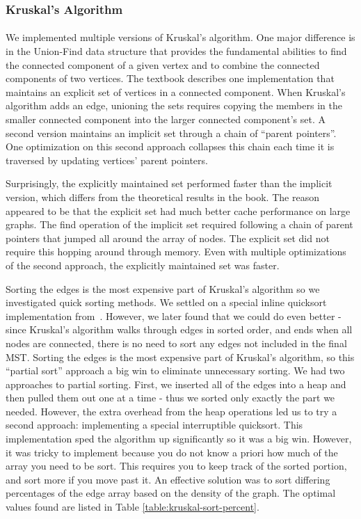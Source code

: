 \subsubsection{Kruskal's Algorithm}
\paragraph{}
We implemented multiple versions of Kruskal's algorithm. One major difference is
in the Union-Find data structure that provides the fundamental abilities to find
the connected component of a given vertex and to combine the connected
components of two vertices. The textbook describes one implementation that
maintains an explicit set of vertices in a connected component. When Kruskal's
algorithm adds an edge, unioning the sets requires copying the members in the
smaller connected component into the larger connected component's set. A second
version maintains an implicit set through a chain of ``parent pointers''. One
optimization on this second approach collapses this chain each time it is
traversed by updating vertices' parent pointers.

Surprisingly, the explicitly maintained set performed faster than the implicit
version, which differs from the theoretical results in the book. The reason
appeared to be that the explicit set had much better cache performance on large
graphs. The find operation of the implicit set required following a chain of
parent pointers that jumped all around the array of nodes. The explicit set did
not require this hopping around through memory. Even with multiple optimizations
of the second approach, the explicitly maintained set was faster.

Sorting the edges is the most expensive part of Kruskal's algorithm so we
investigated quick sorting methods.  We settled on a special inline quicksort
implementation from~\cite{qsort}.  However, we later found that we could do even
better - since Kruskal's algorithm walks through edges in sorted order, and ends
when all nodes are connected, there is no need to sort any edges not included in
the final MST.  Sorting the edges is the most expensive part of Kruskal's
algorithm, so this ``partial sort'' approach a big win to eliminate unnecessary
sorting.  We had two approaches to partial sorting.  First, we inserted all of
the edges into a heap and then pulled them out one at a time - thus we sorted
only exactly the part we needed.  However, the extra overhead from the heap
operations led us to try a second approach: implementing a special interruptible
quicksort.  This implementation sped the algorithm up significantly so it was a
big win.  However, it was tricky to implement because you do not know a priori
how much of the array you need to be sort.  This requires you to keep track of
the sorted portion, and sort more if you move past it. An effective solution was
to sort differing percentages of the edge array based on the density of the
graph. The optimal values found are listed in Table
\ref{table:kruskal-sort-percent}.

